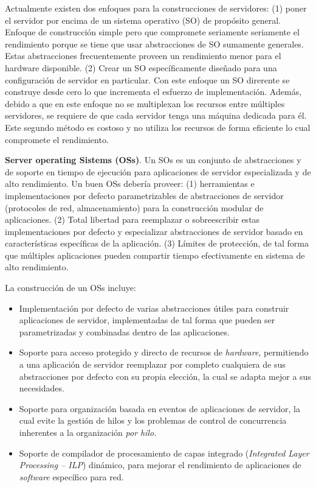 Actualmente existen dos enfoques para la construcciones de servidores: (1) poner el servidor por encima de un sistema operativo (SO) de propósito general. Enfoque de construcción simple pero que compromete seriamente seriamente el rendimiento porque se tiene que usar abstracciones de SO sumamente generales. Estas abstracciones frecuentemente proveen un rendimiento menor para el hardware disponible. (2) Crear un SO específicamente diseñado para una configuración de servidor en particular. Con este enfoque un SO direrente se construye desde cero lo que incrementa el esfuerzo de implementación. Además, debido a que en este enfoque no se multiplexan los recursos entre múltiples servidores, se requiere de que cada servidor tenga una máquina dedicada para él. Este segundo método es costoso y no utiliza los recursos de forma eficiente lo cual compromete el rendimiento.

\textbf{Server operating Sistems (OSs)}. Un SOs es un conjunto de abstracciones y de soporte en tiempo de ejecución para aplicaciones de servidor especializada y de alto rendimiento. Un buen OSs debería proveer: (1) herramientas e implementaciones por defecto parametrizables de abstracciones de servidor (protocoles de red, almacenamiento) para la construcción modular de aplicaciones. (2) Total libertad para reemplazar o sobreescribir estas implementaciones por defecto y especializar abstracciones de servidor basado en características específicas de la aplicación. (3) Límites de protección, de tal forma que múltiples aplicaciones pueden compartir tiempo efectivamente en sistema de alto rendimiento.

La construcción de un OSs incluye:
\begin{itemize}
    \item Implementación por defecto de varias abstracciones útiles para construir aplicaciones de servidor, implementadas de tal forma que pueden ser parametrizadas y combinadas dentro de las aplicaciones.
    \item Soporte para acceso protegido y directo de recursos de \textit{hardware}, permitiendo a una aplicación de servidor reemplazar por completo cualquiera de sus abstracciones por defecto  con su propia elección, la cual se adapta mejor a sus necesidades.
    \item Soporte para organización basada en eventos de aplicaciones de servidor, la cual evite la gestión de hilos y los problemas de control de concurrencia inherentes a la organización \textit{por hilo.}
    \item Soporte de compilador de procesamiento de capas integrado (\textit{Integrated Layer Processing -- ILP}) dinámico, para mejorar el rendimiento de aplicaciones de \textit{software} específico para red.
\end{itemize}

